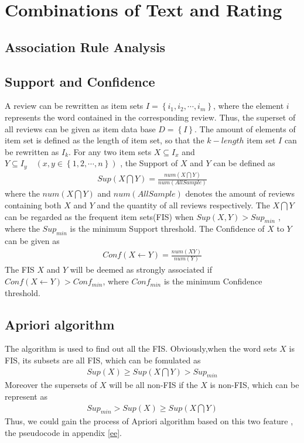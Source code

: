 \documentclass[12pt]{article}%
\begin{document}
\section{Combinations of Text and Rating}

\subsection{Association Rule Analysis}
\subsection{Support and Confidence}
A review can be rewritten as item sets $I=\left \{  i_{1},i_{2},\cdots,i_{m}\right \}$, where the element $i$ represents the word contained in the corresponding review. Thus, the superset of all reviews can be given as item data base $D=\left \{ I \right \}$. The amount of elements of item set is defined as the length of item set, so that the $k-length$ item set $I$ can be rewritten as $I_{k}$. For any two item sets $X\subseteq I_{x}$ and $Y\subseteq I_{y}\quad(x,y\in \left \{ 1,2,\cdots,n \right \})$ , the Support of $X$ and $Y$ can be defined as 
\begin{gather}
Sup(X\bigcap Y)=\frac{num(X\bigcap Y)}{num(AllSample)}
\end{gather}
where the $num(X\bigcap Y)$ and $num(AllSample)$ denotes the amount of reviews containing both $X$ and $Y$ and the quantity of all reviews respectively. The $X\bigcap Y$ can be regarded as the frequent item sets(FIS)\cite{bib:4} when $Sup(X,Y)>Sup_{min}$ ,  where the  $Sup_{min}$ is the minimum Support threshold. The Confidence of $X$ to $Y$ can be given as 
\begin{gather}
Conf(X\leftarrow Y)=\frac{num(XY)}{num(Y)}
\end{gather}
 The FIS $X$ and $Y$ will be deemed as strongly associated\cite{bib:4} if $Conf(X\leftarrow Y)>Conf_{min}$, where $Conf_{min}$ is the minimum Confidence threshold.
\subsection{Apriori algorithm}
The algorithm is used to find out all the FIS. Obviously,when the word sets $X$ is FIS,
its subsets are all FIS\cite{bib:66}, which can be fomulated as 
\begin{gather}
Sup(X)\geqslant Sup(X\bigcap Y)>Sup_{min}
\end{gather}
Moreover the supersets of $X$ will be all non-FIS if the $X$ is non-FIS\cite{bib:66}, which can be represent as
\begin{gather}
Sup_{min}>Sup(X)\geqslant Sup(X\bigcap Y)
\end{gather}
Thus, we could gain the process of Apriori algorithm based on this two feature 
, the pseudocode in appendix \ref{ee}.
 
\end{document}
